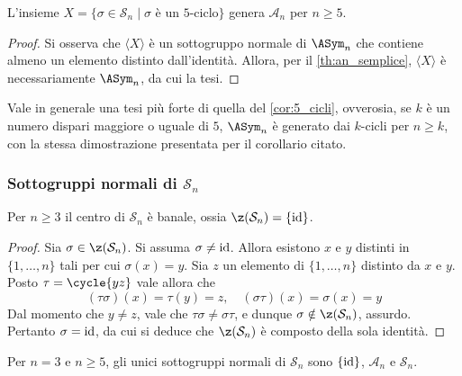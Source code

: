 \documentclass[11pt]{scrartcl}
\begin{document}
	\begin{corollary}
		\label{cor:5_cicli}
		L'insieme $X = \{\sigma \in \mathcal{S}_n\mid \sigma \text{ è un }5\text{-ciclo}\}$ genera
		$\mathcal{A}_n$ per $n \geq 5$.
	\end{corollary}
	
	\begin{proof}
		Si osserva che $\langle X \rangle$ è un sottogruppo normale di
		$\ASym_n$ che contiene almeno un elemento distinto dall'identità.
		Allora, per il \autoref{th:an_semplice}, $\langle X \rangle$ è necessariamente
		$\ASym_n$, da cui la tesi.
	\end{proof}
	
	\begin{remark}
		Vale in generale una tesi più forte di quella del \autoref{cor:5_cicli},
		ovverosia, se $k$ è un numero dispari maggiore o uguale di $5$,
		$\ASym_n$ è generato dai $k$-cicli per $n \geq k$, con la stessa dimostrazione
		presentata per il corollario citato.
	\end{remark}
	
	\subsubsection{Sottogruppi normali di \texorpdfstring{$\mathcal{S}_n$}{Sₙ}}
	
	\begin{lemma}
		\label{lemma1.65}
		Per $n \geq 3$ il centro di $\mathcal{S}_n$ è banale, ossia $\z(\mathcal{S}_n) = \{\id\}$.
	\end{lemma}
	
	\begin{proof}
		Sia $\sigma \in \z(\mathcal{S}_n)$. Si assuma $\sigma \neq \mathrm{id}$.
		Allora esistono $x$ e $y$
		distinti in $\{1, \ldots, n\}$ tali per cui $\sigma(x) = y$. Sia $z$ un elemento
		di $\{1, \ldots, n\}$ distinto da $x$ e $y$. Posto $\tau = \cycle{y z}$
		vale allora che
		\[ (\tau \sigma)(x) = \tau(y) = z, \quad (\sigma \tau)(x) = \sigma(x) = y \]
		Dal momento che $y \neq z$, vale che $\tau \sigma \neq \sigma \tau$, e dunque $\sigma
		\notin \z(\mathcal{S}_n)$, assurdo. Pertanto $\sigma = \mathrm{id}$, da cui si deduce
		che $\z(\mathcal{S}_n)$ è composto
		della sola identità.
	\end{proof}
	
	\begin{proposition}
		\label{prop:sottogruppi_normali_sn}
		Per $n = 3$ e $n \geq 5$, gli unici sottogruppi normali di $\mathcal{S}_n$ sono $\{\mathrm{id}\}$,
		$\mathcal{A}_n$ e $\mathcal{S}_n$.
	\end{proposition}
	
\end{document}
